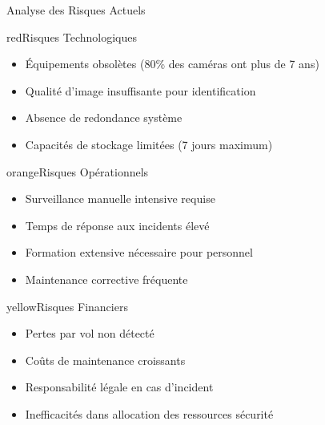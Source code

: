 \documentclass{dollarama}
\begin{document}
\begin{dollaramarisks}{Analyse des Risques Actuels}

\begin{dollaramariskcategory}{red}{Risques Technologiques}
\begin{itemize}
    \item Équipements obsolètes (80\% des caméras ont plus de 7 ans)
    \item Qualité d'image insuffisante pour identification
    \item Absence de redondance système
    \item Capacités de stockage limitées (7 jours maximum)
\end{itemize}
\end{dollaramariskcategory}

\begin{dollaramariskcategory}{orange}{Risques Opérationnels}
\begin{itemize}
    \item Surveillance manuelle intensive requise
    \item Temps de réponse aux incidents élevé
    \item Formation extensive nécessaire pour personnel
    \item Maintenance corrective fréquente
\end{itemize}
\end{dollaramariskcategory}

\begin{dollaramariskcategory}{yellow}{Risques Financiers}
\begin{itemize}
    \item Pertes par vol non détecté
    \item Coûts de maintenance croissants
    \item Responsabilité légale en cas d'incident
    \item Inefficacités dans allocation des ressources sécurité
\end{itemize}
\end{dollaramariskcategory}

\end{dollaramarisks}


\clearpage
\end{document}
